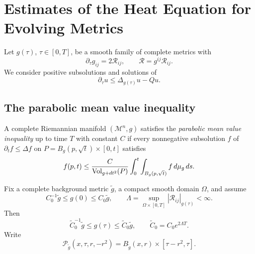 \chapter{Estimates of the Heat Equation for Evolving Metrics}
\label{ch:chow-iii-estimates-heat-equation-evolving-metrics}

Let \(g(\tau)\), \(\tau\in[0,T]\), be a smooth family of complete metrics
with
\[
 \partial_\tau g_{ij}=2\mathcal R_{ij},\qquad
 \mathcal R=g^{ij}\mathcal R_{ij}.
\]
We consider positive subsolutions and solutions of
\[
 \partial_\tau u\leq \Delta_{g(\tau)}u-Qu.
\]

\section{The parabolic mean value inequality}

\begin{definition}
\label{def:chow-iii-parabolic-mean-value-inequality}
A complete Riemannian manifold \((\mathcal M^n,g)\) satisfies the
\emph{parabolic mean value inequality} up to time \(T\) with constant \(C\)
if every nonnegative subsolution \(f\) of \(\partial_t f\leq\Delta f\) on
\(P=B_g(p,\sqrt t)\times[0,t]\) satisfies
\[
 f(p,t)\leq \frac{C}{\operatorname{Vol}_{g+dt^2}(P)}
 \int_0^t\int_{B_g(p,\sqrt t)}f\,d\mu_g\,ds.
\]
\end{definition}

Fix a complete background metric \(\widetilde g\), a compact smooth domain
\(\Omega\), and assume
\[
 C_0^{-1}\widetilde g\leq g(0)\leq C_0\widetilde g,
 \qquad
 \Lambda=\sup_{\Omega\times[0,T]}|\mathcal R_{ij}|_{g(\tau)}<\infty.
\]
Then
\[
 \widetilde C_0^{-1}\widetilde g\leq g(\tau)
 \leq\widetilde C_0\widetilde g,
 \qquad \widetilde C_0=C_0e^{2\Lambda T}.
\]
Write
\[
 \mathcal P_{\widetilde g}(x,\tau,r,-r^2)
 =B_{\widetilde g}(x,r)\times[\tau-r^2,\tau].
\]

